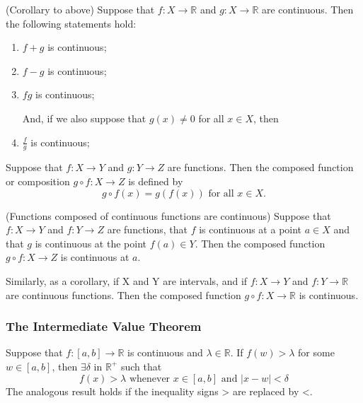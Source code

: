 \documentclass[12pt]{article}
\begin{document}
			\begin{thm}
				(Corollary to above) Suppose that $f : X \to \mathbb{R}$ and $g : X \to \mathbb{R}$ are 							continuous. Then the following statements hold:
				\begin{enumerate}
					\item $f + g$ is continuous;
					\item $f - g$ is continuous;
					\item $fg$ is continuous;

				And, if we also suppose that $g(x) \neq 0$ for all $x \in X$, then

					\item $\frac{f}{g}$ is continuous;
				\end{enumerate}
			\end{thm}

			\begin{defn}
				Suppose that $f : X \to Y$ and $g : Y \to Z$ are functions. Then the composed function or 							composition $g \circ f : X \to Z$ is defined by
					\[
						g \circ f(x) = g(f(x)) \mbox{   for all    } x \in X.
					\]
			\end{defn}

			\begin{thm}
				(Functions composed of continuous functions are continuous) Suppose that $f : X \to Y$ and $f : Y 						\to Z$ are functions, that $f$ is continuous at a point $a \in X$ and that $g$ is continuous at 					the point $f(a) \in Y$. Then the composed function $g \circ f : X \to Z$ is continuous at $a$.

				Similarly, as a corollary, if X and Y are intervals, and if $f : X \to Y$ and $f : Y \to \mathbb{R}$ are 						continuous functions. Then the composed function $g \circ f : X \to \mathbb{R}$ is 							continuous.
			\end{thm}
		
		\subsubsection{The Intermediate Value Theorem}

			\begin{lemma}
				Suppose that $f : [a,b] \to \mathbb{R}$ is continuous and $\lambda \in \mathbb{R}$. If $f(w) > 							\lambda$ for some $w \in [a,b]$, then $\exists \delta$ in $\mathbb{R}^+$ such that
					\[
						f(x) > \lambda \mbox{   whenever   } x \in [a,b] \mbox{   and   } |x-w| < \delta
					\]
				The analogous result holds if the inequality signs > are replaced by <.
			\end{lemma}
\end{document}
